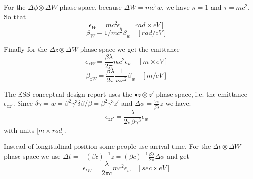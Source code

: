 \documentclass{article}
\begin{document}
For the $ \Delta\phi\otimes\Delta W $ phase space, because $ \Delta W = mc^{2} w $, we have $ \kappa = 1 $ and $ \tau = mc^{2} $.
So that 
\begin{equation}
\epsilon_{W} = mc^{2}\epsilon_{w}\quad [rad\times eV] \label{}
\end{equation}
\begin{equation}
\beta_{W} = 1/mc^{2}\beta_{w}\quad  [rad/eV] \label{}
\end{equation}

Finally for the $ \Delta z\otimes\Delta W $ phase space we get the emittance
\begin{equation}
\epsilon_{zW} = \frac{\beta \lambda} {2 \pi}mc^{2}\epsilon_{w}\quad  [m\times eV] \label{}
\end{equation}
\begin{equation}
\beta_{zW} = \frac{\beta \lambda} {2 \pi}\frac{1}{mc^{2}}\beta_{w}\quad  [m/eV] \label{}
\end{equation}

The ESS conceptual design report uses the $•z\otimes z'$ phase space, i.e. the emittance $ \epsilon_{zz'} $. Since $ \delta\gamma = w = \beta^{2}\gamma^{3} \delta\beta / \beta = \beta^{2}\gamma^{3} z' $ and 
$\Delta\phi  = \frac{2\pi}{\beta\lambda}z$ we have:
\begin{equation}
\epsilon_{zz'} = \frac{\lambda}{2\pi\beta\gamma^{3}}\epsilon_{w} \label{}
\end{equation}
with units [$m\times rad$].

Instead of longitudinal position some people use arrival time. For the $ \Delta t \otimes \Delta W $ phase space we use 
$\Delta t = -(\beta c)^{-1} z = (\beta c)^{-1} \frac{\beta\lambda}{2\pi} \Delta \phi$ and get
\begin{equation}
\epsilon_{tW} = \frac{\lambda} {2 \pi c} mc^{2}\epsilon_{w}\quad  [sec\times eV]\label{}
\end{equation}
\end{document}
